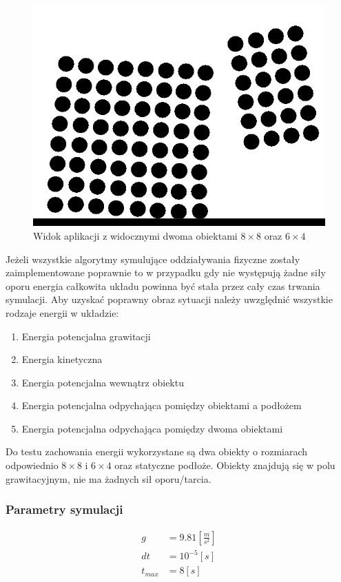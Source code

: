 \documentclass[12pt, letterpaper]{report}
\begin{document}
    \begin{figure}
        \includegraphics[width=0.9\linewidth]{objects_raw} 
        \caption{Widok aplikacji z widocznymi dwoma obiektami $8 \times 8$ oraz $6 \times 4$}
    \end{figure}
    Jeżeli wszystkie algorytmy symulujące oddziaływania fizyczne zostały zaimplementowane poprawnie 
    to w przypadku gdy nie występują żadne siły oporu energia całkowita układu powinna 
    być stała przez cały czas trwania symulacji. Aby uzyskać poprawny obraz sytuacji należy 
    uwzględnić wszystkie rodzaje energii w układzie: 
    \begin{enumerate}
        \item Energia potencjalna grawitacji
        \item Energia kinetyczna
        \item Energia potencjalna wewnątrz obiektu
        \item Energia potencjalna odpychająca pomiędzy obiektami a podłożem
        \item Energia potencjalna odpychająca pomiędzy dwoma obiektami
    \end{enumerate}

    Do testu zachowania energii wykorzystane są dwa obiekty o rozmiarach 
    odpowiednio $8 \times 8$ i $6 \times 4$ oraz statyczne podłoże. Obiekty
    znajdują się w polu grawitacyjnym, nie ma żadnych sił oporu/tarcia.

    \subsubsection{Parametry symulacji}
    \begin{align*}
        g &= 9.81 [\frac{m}{s^2}] \\
        dt &= 10^{-5} [s] \\
        t_{max} &= 8 [s]
    \end{align*}
\end{document}
